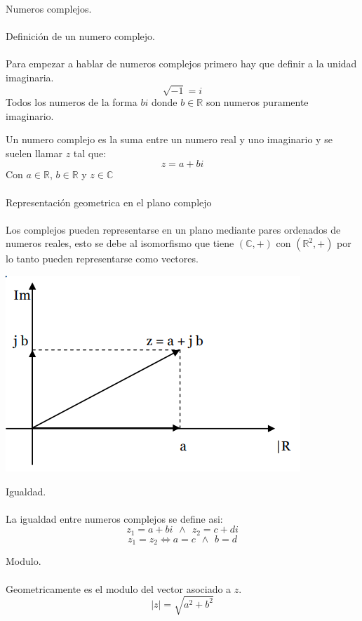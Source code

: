 \documentclass[]{article}
\begin{document}
\huge Numeros complejos.
\\
\\
\Large Definición de un numero complejo.
\normalsize
\\
\\
Para empezar a hablar de numeros complejos primero hay que definir a la unidad imaginaria.
$$
\sqrt{-1} = i
$$
Todos los numeros de la forma $bi$ donde $b \in \mathbb{R}$ son numeros puramente imaginario.

Un numero complejo es la suma entre un numero real y uno imaginario y se suelen llamar $z$ tal que:
$$
z=a+bi
$$
Con $a \in \mathbb{R}$, $b \in \mathbb{R} $ y $z \in \mathbb{C}$
\\
\\
\Large Representación geometrica en el plano complejo
\normalsize
\\
\\
Los complejos pueden representarse en un plano mediante pares ordenados de numeros reales, esto se debe al isomorfismo que tiene $(\mathbb{C},+)$ con $(\mathbb{R}^{2},+)$ por lo tanto pueden representarse como vectores.

\includegraphics{../../../Imagenes/Superior/Complejos/Complejos01.PNG}


\Large Igualdad.
\normalsize
\\
\\
La igualdad entre numeros complejos se define asi:
$$
z_1 = a+bi \hspace{5pt}\wedge\hspace{5pt} z_2=c+di
$$
$$
z_1 = z_2 \Leftrightarrow a = c \hspace{5pt}\wedge\hspace{5pt} b = d
$$

\Large Modulo.
\normalsize
\\
\\
Geometricamente es el modulo del vector asociado a $z$.
$$
|z| = \sqrt{a^{2}+b^{2}}
$$
\end{document}

